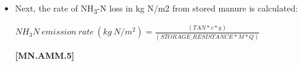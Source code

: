 \begin{refsection}
\begin{itemize}
            {\raggedleft \textbf{[MN.AMM.2]}\par}
            \vspace{0.5cm}

\textbf{When:}
    \begin{itemize}
        \item Manure temperature (K): temperature of manure storage.
        \item DEFAULT\_STORED\_MANURE\_PH: the pH of the manure in storage, set to 7.5 by default

    \end{itemize}

        
        Equilibrium coefficient (Q)
         \vspace{0.2cm}

    \begin{center}
\(Q = K_h * K_a \)
    \end{center}
        \vspace{0.5cm} 
    
            {\raggedleft \textbf{[MN.AMM.3]}\par}
            \vspace{0.5cm}

\textbf{When:}
    \begin{itemize}
        \item K\textsubscript{h}: Henry’s law coefficient, calculated in \textbf{[MN.AMM.1]}.
        \item K\textsubscript{a}: Dissociation coefficient of ammonium, calculated in \textbf{[MN.AMM.2]}.
    \end{itemize}
    \vspace{0.5cm}
    

        \item Next, the rate of NH\textsubscript{3}-N loss in kg N/m2 from stored manure is calculated:
         \vspace{0.2cm}

\begin{center}
\(NH_3N\ emission\ rate\ (kg\ N/m^2)= \frac{(TAN * c * y)}{(STORAGE\_RESISTANCE * M * Q)} \)
    \end{center}
        \vspace{0.5cm} 
    
            {\raggedleft \textbf{[MN.AMM.5]}\par}
            \vspace{0.5cm}


\end{itemize}
\end{refsection}
